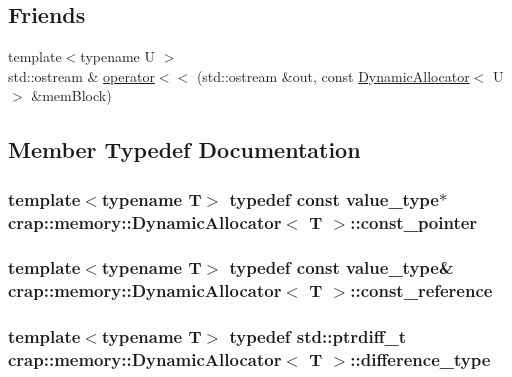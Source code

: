 \subsection*{Friends}
\begin{DoxyCompactItemize}
\item 
{\footnotesize template$<$typename U $>$ }\\std\-::ostream \& \hyperlink{classcrap_1_1memory_1_1_dynamic_allocator_a765efe37ddf5e7be9f9c60062e75cfd7}{operator$<$$<$} (std\-::ostream \&out, const \hyperlink{classcrap_1_1memory_1_1_dynamic_allocator}{Dynamic\-Allocator}$<$ U $>$ \&mem\-Block)
\end{DoxyCompactItemize}


\subsection{Member Typedef Documentation}
\hypertarget{classcrap_1_1memory_1_1_dynamic_allocator_a31367ceafaf5d2a05c3a04e975e53775}{
\subsubsection[{const\-\_\-pointer}]{\setlength{\rightskip}{0pt plus 5cm}template$<$typename T$>$ typedef const {\bf value\-\_\-type}$\ast$ {\bf crap\-::memory\-::\-Dynamic\-Allocator}$<$ T $>$\-::{\bf const\-\_\-pointer}}}\label{classcrap_1_1memory_1_1_dynamic_allocator_a31367ceafaf5d2a05c3a04e975e53775}
\hypertarget{classcrap_1_1memory_1_1_dynamic_allocator_aa4033bbb72cceae0d908aec9a9539f81}{
\subsubsection[{const\-\_\-reference}]{\setlength{\rightskip}{0pt plus 5cm}template$<$typename T$>$ typedef const {\bf value\-\_\-type}\& {\bf crap\-::memory\-::\-Dynamic\-Allocator}$<$ T $>$\-::{\bf const\-\_\-reference}}}\label{classcrap_1_1memory_1_1_dynamic_allocator_aa4033bbb72cceae0d908aec9a9539f81}
\hypertarget{classcrap_1_1memory_1_1_dynamic_allocator_a0cc60d8108a3a59ecef542f79f5ca53a}{
\subsubsection[{difference\-\_\-type}]{\setlength{\rightskip}{0pt plus 5cm}template$<$typename T$>$ typedef std\-::ptrdiff\-\_\-t {\bf crap\-::memory\-::\-Dynamic\-Allocator}$<$ T $>$\-::{\bf difference\-\_\-type}}}\label{classcrap_1_1memory_1_1_dynamic_allocator_a0cc60d8108a3a59ecef542f79f5ca53a}
